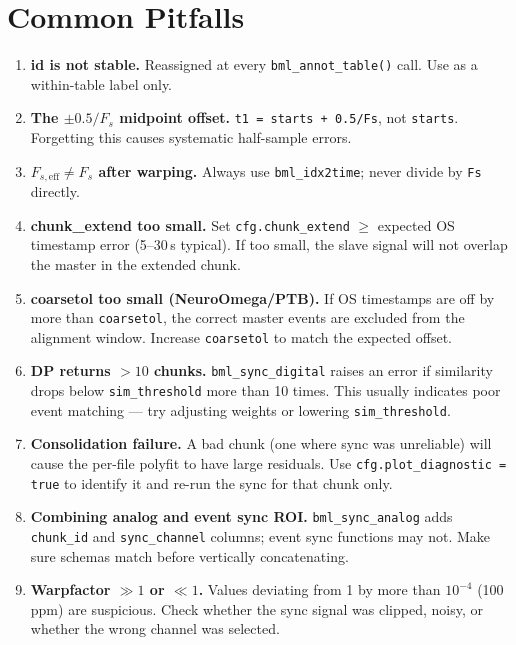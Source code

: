 \documentclass[11pt, a4paper]{article}
\begin{document}
\section{Common Pitfalls}

\begin{enumerate}[leftmargin=*, label=\textbf{\arabic*.}]
  \item \textbf{id is not stable.} Reassigned at every \texttt{bml\_annot\_table()} call. Use as a within-table label only.
  \item \textbf{The $\pm 0.5/F_s$ midpoint offset.} \texttt{t1 = starts + 0.5/Fs}, not \texttt{starts}. Forgetting this causes systematic half-sample errors.
  \item \textbf{$F_{s,\text{eff}} \neq F_s$ after warping.} Always use \texttt{bml\_idx2time}; never divide by \texttt{Fs} directly.
  \item \textbf{chunk\_extend too small.} Set \texttt{cfg.chunk\_extend} $\geq$ expected OS timestamp error (5--30\,s typical). If too small, the slave signal will not overlap the master in the extended chunk.
  \item \textbf{coarsetol too small (NeuroOmega/PTB).} If OS timestamps are off by more than \texttt{coarsetol}, the correct master events are excluded from the alignment window. Increase \texttt{coarsetol} to match the expected offset.
  \item \textbf{DP returns $>10$ chunks.} \texttt{bml\_sync\_digital} raises an error if similarity drops below \texttt{sim\_threshold} more than 10 times. This usually indicates poor event matching --- try adjusting weights or lowering \texttt{sim\_threshold}.
  \item \textbf{Consolidation failure.} A bad chunk (one where sync was unreliable) will cause the per-file polyfit to have large residuals. Use \texttt{cfg.plot\_diagnostic = true} to identify it and re-run the sync for that chunk only.
  \item \textbf{Combining analog and event sync ROI.} \texttt{bml\_sync\_analog} adds \texttt{chunk\_id} and \texttt{sync\_channel} columns; event sync functions may not. Make sure schemas match before vertically concatenating.
  \item \textbf{Warpfactor $\gg 1$ or $\ll 1$.} Values deviating from 1 by more than $10^{-4}$ (100\,ppm) are suspicious. Check whether the sync signal was clipped, noisy, or whether the wrong channel was selected.
\end{enumerate}
\end{document}
